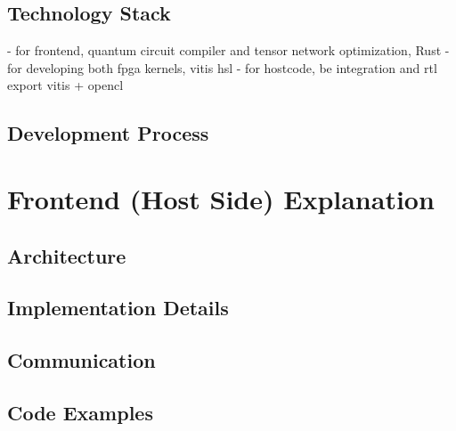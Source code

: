 \documentclass[12pt,oneside,a4paper]{article}
\begin{document}
\subsection{Technology Stack}
- for frontend, quantum circuit compiler and tensor network optimization, Rust
- for developing both fpga kernels, vitis hsl
- for hostcode, be integration and rtl export vitis + opencl

\subsection{Development Process}




\section{Frontend (Host Side) Explanation}

\subsection{Architecture}

\subsection{Implementation Details}

\subsection{Communication}

\subsection{Code Examples}
\end{document}
